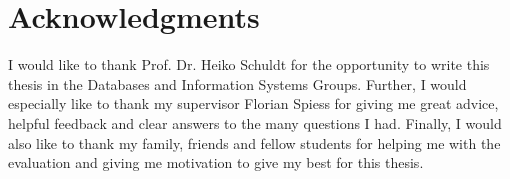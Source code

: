 \chapter{Acknowledgments}
I would like to thank Prof. Dr. Heiko Schuldt for the opportunity to write this thesis in the Databases and Information Systems Groups. Further, I would especially like to thank my supervisor Florian Spiess for giving me great advice, helpful feedback and clear answers to the many questions I had. Finally, I would also like to thank my family, friends and fellow students for helping me with the evaluation and giving me motivation to give my best for this thesis.